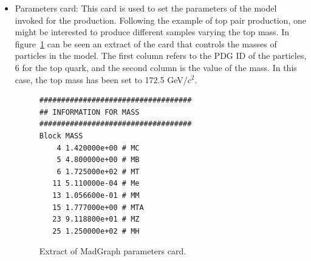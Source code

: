 \begin{itemize}
  \item Parameters card: This card is used to set the parameters of the model invoked for the production. Following the example of top pair production, one might be interested to produce different samples varying the top mass. In figure~\ref{fig:ParamCard} can be seen an extract of the card that controls the masses of particles in the model. The first column refers to the PDG ID of the particles, 6 for the top quark, and the second column is the value of the mass. In this case, the top mass has been set to 172.5 GeV/$c^{2}$.
    \begin{figure}[!Hhtbp]
      \begin{center}
        \begin{minipage}[c]{0.45\textwidth}
\begin{verbatim}
###################################
## INFORMATION FOR MASS
###################################
Block MASS 
    4 1.420000e+00 # MC 
    5 4.800000e+00 # MB 
    6 1.725000e+02 # MT 
   11 5.110000e-04 # Me 
   13 1.056600e-01 # MM 
   15 1.777000e+00 # MTA 
   23 9.118800e+01 # MZ 
   25 1.250000e+02 # MH 
\end{verbatim}
        \end{minipage}
          \caption{Extract of MadGraph parameters card.}
          \label{fig:ParamCard}
      \end{center}
    \end{figure}


\end{itemize}
